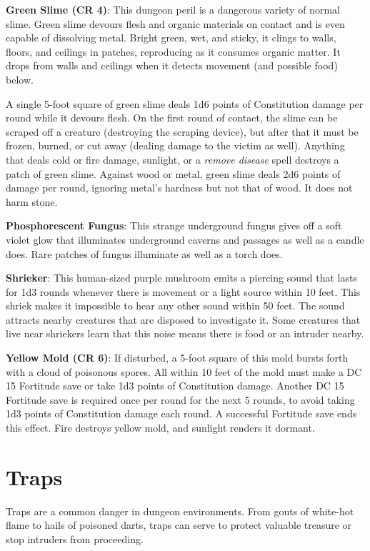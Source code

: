 \textbf{Green Slime (CR 4)}: This dungeon peril is a dangerous variety of normal slime. Green slime devours flesh and organic materials on contact and is even capable of dissolving metal. Bright green, wet, and sticky, it clings to walls, floors, and ceilings in patches, reproducing as it consumes organic matter. It drops from walls and ceilings when it detects movement (and possible food) below.
				
A single 5-foot square of green slime deals 1d6 points of Constitution damage per round while it devours flesh. On the first round of contact, the slime can be scraped off a creature (destroying the scraping device), but after that it must be frozen, burned, or cut away (dealing damage to the victim as well). Anything that deals cold or fire damage, sunlight, or a \textit{remove disease }spell destroys a patch of green slime. Against wood or metal, green slime deals 2d6 points of damage per round, ignoring metal's hardness but not that of wood. It does not harm stone.
				
\textbf{Phosphorescent Fungus}: This strange underground fungus gives off a soft violet glow that illuminates underground caverns and passages as well as a candle does. Rare patches of fungus illuminate as well as a torch does.
				
\textbf{Shrieker}: This human-sized purple mushroom emits a piercing sound that lasts for 1d3 rounds whenever there is movement or a light source within 10 feet. This shriek makes it impossible to hear any other sound within 50 feet. The sound attracts nearby creatures that are disposed to investigate it. Some creatures that live near shriekers learn that this noise means there is food or an intruder nearby.
				
\textbf{Yellow Mold (CR 6)}: If disturbed, a 5-foot square of this mold bursts forth with a cloud of poisonous spores. All within 10 feet of the mold must make a DC 15 Fortitude save or take 1d3 points of Constitution damage. Another DC 15 Fortitude save is required once per round for the next 5 rounds, to avoid taking 1d3 points of Constitution damage each round. A successful Fortitude save ends this effect. Fire destroys yellow mold, and sunlight renders it dormant.
				
\section{Traps}

				
Traps are a common danger in dungeon environments. From gouts of white-hot flame to hails of poisoned darts, traps can serve to protect valuable treasure or stop intruders from proceeding.
				
